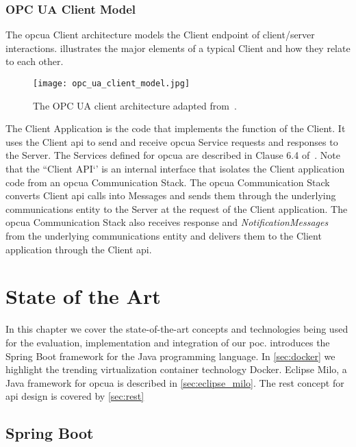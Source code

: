 \documentclass[
a4paper,
twoside,
headsepline,
cleardoublepage=empty,
parskip=half,
draft=false
]{scrbook}
\begin{document}
			\subsection{OPC UA Client Model}\label{subsec:opc_ua_client_model}

				The \gls{opcua} Client architecture models the Client endpoint of client/server interactions.  illustrates the major elements of a typical Client and how they relate to each other.

				\begin{figure}[htbp]
					\centering
					\texttt{[image: opc\_ua\_client\_model.jpg]}
					\caption{The OPC UA client architecture adapted from~\cite{opcfoundation2017part1}.}
					\label{fig:opc_ua_client_model}
				\end{figure}

				The Client Application is the code that implements the function of the Client.
				It uses the Client \gls{api} to send and receive \gls{opcua} Service requests and responses to the Server.
				The Services defined for \gls{opcua} are described in Clause 6.4 of~\cite{opcfoundation2017part4}.
				Note that the ``Client API`' is an internal interface that isolates the Client application code from an \gls{opcua} Communication Stack.
				The \gls{opcua} Communication Stack converts Client \gls{api} calls into Messages and sends them through the underlying communications entity to the Server at the request of the Client application.
				The \gls{opcua} Communication Stack also receives response and \textit{NotificationMessages} from the underlying communications entity and delivers them to the Client application through the Client \gls{api}.

	\chapter{State of the Art}\label{ch:state_of_the_art}
	
		
		In this chapter we cover the state-of-the-art concepts and technologies being used for the evaluation, implementation and integration of our \gls{poc}.  introduces the Spring Boot framework for the Java programming language. In \cref{sec:docker} we highlight the trending virtualization container technology Docker. Eclipse Milo, a Java framework for \gls{opcua} is described in \cref{sec:eclipse_milo}. The \gls{rest} concept for \gls{api} design is covered by \cref{sec:rest}

		\section{Spring Boot}\label{sec:spring_boot}
\end{document}
